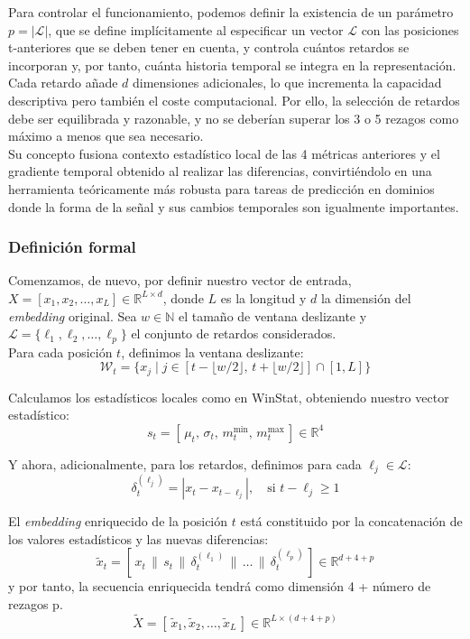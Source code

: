 Para controlar el funcionamiento, podemos definir la existencia de un parámetro $p = |\mathcal{L}|$, que se define implícitamente al especificar un vector $\mathcal{L}$ con las posiciones t-anteriores que se deben tener en cuenta, y controla cuántos retardos se incorporan y, por tanto, cuánta historia temporal se integra en la representación. Cada retardo añade $d$ dimensiones adicionales, lo que incrementa la capacidad descriptiva pero también el coste computacional. Por ello, la selección de retardos debe ser equilibrada y razonable, y no se deberían superar los 3 o 5 rezagos como máximo a menos que sea necesario.\\

Su concepto fusiona contexto estadístico local de las 4 métricas anteriores y el gradiente temporal obtenido al realizar las diferencias, convirtiéndolo en una herramienta teóricamente más robusta para tareas de predicción en dominios donde la forma de la señal y sus cambios temporales son igualmente importantes.

\subsubsection{Definición formal}

Comenzamos, de nuevo, por definir nuestro vector de entrada, $X = [x_1, x_2, \dots, x_L] \in \mathbb{R}^{L \times d}$, donde $L$ es la longitud y $d$ la dimensión del \textit{embedding} original. Sea $w \in \mathbb{N}$ el tamaño de ventana deslizante y $\mathcal{L} = \{\ell_1, \ell_2, \dots, \ell_p\}$ el conjunto de retardos considerados.\\

Para cada posición $t$, definimos la ventana deslizante:
\[
\mathcal{W}_t = \{ x_j \mid j \in [t - \lfloor w/2 \rfloor,\, t + \lfloor w/2 \rfloor] \cap [1, L] \}
\]

Calculamos los estadísticos locales como en WinStat, obteniendo nuestro vector estadístico:
\[
s_t = [\,\mu_t,\, \sigma_t,\, m^{\min}_t,\, m^{\max}_t\,] \in \mathbb{R}^4
\]

Y ahora, adicionalmente, para los retardos, definimos para cada $\ell_j \in \mathcal{L}$:
\[
\delta_t^{(\ell_j)} = | x_t - x_{t - \ell_j}|, \quad \text{si } t - \ell_j \geq 1
\]

El \textit{embedding} enriquecido de la posición $t$ está constituido por la concatenación de los valores estadísticos y las nuevas diferencias:
\[
\tilde{x}_t = [\,x_t \,\|\, s_t \,\|\, \delta_t^{(\ell_1)} \,\|\, \dots \,\|\, \delta_t^{(\ell_p)}\,] \in \mathbb{R}^{d + 4 + p}
\]
y por tanto, la secuencia enriquecida tendrá como dimensión 4 + número de rezagos p.
\[
\tilde{X} = [\,\tilde{x}_1, \tilde{x}_2, \dots, \tilde{x}_L\,] \in \mathbb{R}^{L \times (d+4+p )}
\]

